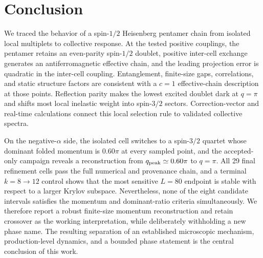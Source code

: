 \section{Conclusion}
\label{sec:conclusion}

We traced the behavior of a spin-$1/2$ Heisenberg pentamer chain from isolated local multiplets to collective response.
At the tested positive couplings, the pentamer retains an even-parity spin-$1/2$ doublet, positive inter-cell exchange generates an antiferromagnetic effective chain, and the leading projection error is quadratic in the inter-cell coupling.
Entanglement, finite-size gaps, correlations, and static structure factors are consistent with a $c=1$ effective-chain description at those points.
Reflection parity makes the lowest excited doublet dark at $q=\pi$ and shifts most local inelastic weight into spin-$3/2$ sectors.
Correction-vector and real-time calculations connect this local selection rule to validated collective spectra.

On the negative-$\alpha$ side, the isolated cell switches to a spin-$3/2$ quartet whose dominant folded momentum is $0.60\pi$ at every sampled point, and the accepted-only campaign reveals a reconstruction from $q_{\mathrm{peak}}\simeq0.60\pi$ to $q=\pi$.
All 29 final refinement cells pass the full numerical and provenance chain, and a terminal $k=8\rightarrow12$ control shows that the most sensitive $L=80$ endpoint is stable with respect to a larger Krylov subspace.
Nevertheless, none of the eight candidate intervals satisfies the momentum and dominant-ratio criteria simultaneously.
We therefore report a robust finite-size momentum reconstruction and retain crossover as the working interpretation, while deliberately withholding a new phase name.
The resulting separation of an established microscopic mechanism, production-level dynamics, and a bounded phase statement is the central conclusion of this work.


